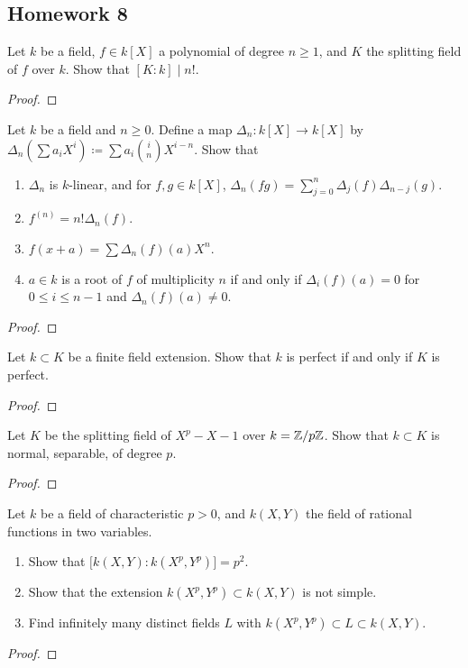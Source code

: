 \subsection{Homework 8}
\begin{problem}
Let $k$ be a field, $f\in k[X]$ a polynomial of degree $n\geq 1$, and $K$
the splitting field of $f$ over $k$. Show that $[K:k]\mid n!$.
\end{problem}
\begin{proof}
\end{proof}

\begin{problem}
Let $k$ be a field and $n\geq 0$. Define a map $\Delta_n\colon k[X]\to
k[X]$ by $\Delta_n\left(\sum a_iX^i\right)\coloneqq\sum a_i\binom{i}{n}
X^{i-n}$. Show that
\begin{enumerate}[label=(\alph*)]
\item $\Delta_n$ is $k$-linear, and for $f,g\in k[X]$,
  $\Delta_n(fg)=\sum_{j=0}^n\Delta_j(f)\Delta_{n-j}(g)$.
\item $f^{(n)}=n!\Delta_n(f)$.
\item $f(x+a)=\sum\Delta_n(f)(a)X^n$.
\item $a\in k$ is a root of $f$ of multiplicity $n$ if and only if
  $\Delta_i(f)(a)=0$ for $0\leq i\leq n-1$ and $\Delta_n(f)(a)\neq 0$.
\end{enumerate}
\end{problem}
\begin{proof}
\end{proof}

\begin{problem}
Let $k\subset K$ be a finite field extension. Show that $k$ is perfect if
and only if $K$ is perfect.
\end{problem}
\begin{proof}
\end{proof}

\begin{problem}
Let $K$ be the splitting field of $X^p-X-1$ over $k=\mathbb{Z}/p\mathbb{Z}$. Show that
$k\subset K$ is normal, separable, of degree $p$.
\end{problem}
\begin{proof}
\end{proof}

\begin{problem}
Let $k$ be a field of characteristic $p>0$, and $k(X,Y)$ the field of
rational functions in two variables.
\begin{enumerate}[label=(\alph*)]
\item Show that $\bigl[k(X,Y):k(X^p,Y^p)\bigr]=p^2$.
\item Show that the extension $k(X^p,Y^p)\subset k(X,Y)$ is not simple.
\item Find infinitely many distinct fields $L$ with $k(X^p,Y^p)\subset
  L\subset k(X,Y)$.
\end{enumerate}
\end{problem}
\begin{proof}
\end{proof}

